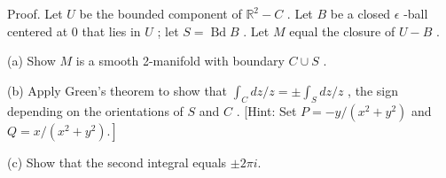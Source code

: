 Proof. Let \(U\) be the bounded component of \({\mathbb{R}}^{2} - C\) . Let \(B\) be a closed \(\epsilon\) -ball centered at 0 that lies in \(U\) ; let \(S = \operatorname{Bd}B\) . Let \(M\) equal the closure of \(U - B\) .

(a) Show \(M\) is a smooth 2-manifold with boundary \(C \cup  S\) .

(b) Apply Green’s theorem to show that \({\int }_{C}{dz}/z =  \pm  {\int }_{S}{dz}/z\) , the sign depending on the orientations of \(S\) and \(C\) . [Hint: Set \(P =  - y/\left( {{x}^{2} + {y}^{2}}\right)\) and \(\left. {Q = x/\left( {{x}^{2} + {y}^{2}}\right) .}\right\rbrack\)

(c) Show that the second integral equals \(\pm  {2\pi i}\).